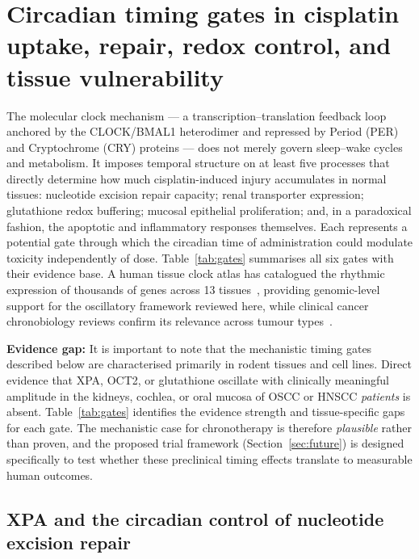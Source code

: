 \documentclass[preprint,review,12pt]{elsarticle}
\begin{document}
\section{Circadian timing gates in cisplatin uptake, repair, redox control,
  and tissue vulnerability}
\label{sec:gates}


The molecular clock mechanism --- a transcription--translation feedback loop
anchored by the CLOCK/BMAL1 heterodimer and repressed by Period (PER) and
Cryptochrome (CRY) proteins --- does not merely govern sleep--wake cycles and
metabolism.  It imposes temporal structure on at least five processes that
directly determine how much cisplatin-induced injury accumulates in normal
tissues: nucleotide excision repair capacity; renal transporter expression;
glutathione redox buffering; mucosal epithelial proliferation; and, in a
paradoxical fashion, the apoptotic and inflammatory responses themselves.
Each represents a potential gate through which the circadian time of
administration could modulate toxicity independently of dose.
Table~\ref{tab:gates} summarises all six gates with their evidence base.
A human tissue clock atlas has catalogued the rhythmic expression of
thousands of genes across 13 tissues~\cite{Ruben2018}, providing
genomic-level support for the oscillatory framework reviewed here, while
clinical cancer chronobiology reviews confirm its relevance across tumour
types~\cite{Sulli2019, SancarVanGelder2021}.

\textbf{Evidence gap:} It is important to note that the mechanistic
timing gates described below are characterised primarily in rodent tissues
and cell lines.  Direct evidence that XPA, OCT2, or glutathione oscillate
with clinically meaningful amplitude in the kidneys, cochlea, or oral
mucosa of OSCC or HNSCC \emph{patients} is absent.  Table~\ref{tab:gates}
identifies the evidence strength and tissue-specific gaps for each gate.
The mechanistic case for chronotherapy is therefore \emph{plausible} rather
than proven, and the proposed trial framework (Section~\ref{sec:future})
is designed specifically to test whether these preclinical timing effects
translate to measurable human outcomes.

\subsection{XPA and the circadian control of nucleotide excision repair}
\end{document}
